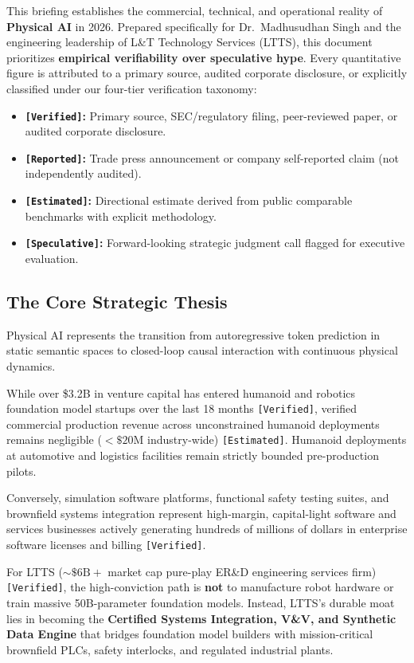 \documentclass[11pt,a4paper]{article}
\begin{document}
This briefing establishes the commercial, technical, and operational reality of \textbf{Physical AI} in 2026. Prepared specifically for Dr.\ Madhusudhan Singh and the engineering leadership of L\&T Technology Services (LTTS), this document prioritizes \textbf{empirical verifiability over speculative hype}. Every quantitative figure is attributed to a primary source, audited corporate disclosure, or explicitly classified under our four-tier verification taxonomy:
\begin{itemize}
    \item \textbf{\texttt{[Verified]}:} Primary source, SEC/regulatory filing, peer-reviewed paper, or audited corporate disclosure.
    \item \textbf{\texttt{[Reported]}:} Trade press announcement or company self-reported claim (not independently audited).
    \item \textbf{\texttt{[Estimated]}:} Directional estimate derived from public comparable benchmarks with explicit methodology.
    \item \textbf{\texttt{[Speculative]}:} Forward-looking strategic judgment call flagged for executive evaluation.
\end{itemize}

\subsection*{The Core Strategic Thesis}
Physical AI represents the transition from autoregressive token prediction in static semantic spaces to closed-loop causal interaction with continuous physical dynamics. 

While over \$3.2B in venture capital has entered humanoid and robotics foundation model startups over the last 18 months \texttt{[Verified]}, verified commercial production revenue across unconstrained humanoid deployments remains negligible ($<\$20\text{M}$ industry-wide) \texttt{[Estimated]}. Humanoid deployments at automotive and logistics facilities remain strictly bounded pre-production pilots.

Conversely, simulation software platforms, functional safety testing suites, and brownfield systems integration represent high-margin, capital-light software and services businesses actively generating hundreds of millions of dollars in enterprise software licenses and billing \texttt{[Verified]}. 

For LTTS ($\sim\$6\text{B}+$ market cap pure-play ER\&D engineering services firm) \texttt{[Verified]}, the high-conviction path is \textbf{not} to manufacture robot hardware or train massive 50B-parameter foundation models. Instead, LTTS's durable moat lies in becoming the \textbf{Certified Systems Integration, V\&V, and Synthetic Data Engine} that bridges foundation model builders with mission-critical brownfield PLCs, safety interlocks, and regulated industrial plants.
\end{document}
